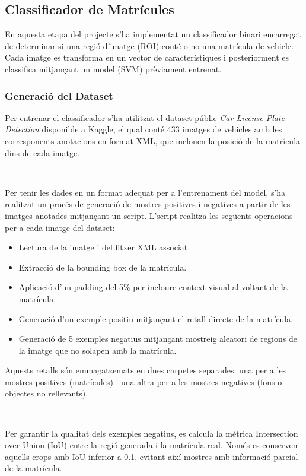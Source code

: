 \subsection{Classificador de Matrícules}

En aquesta etapa del projecte s'ha implementat un classificador binari encarregat de determinar si una regió d'imatge (ROI) conté o no una matrícula de vehicle. Cada imatge es transforma en un vector de característiques i posteriorment es classifica mitjançant un model (SVM) prèviament entrenat. 

\subsubsection{Generació del Dataset}

Per entrenar el classificador s'ha utilitzat el dataset públic \textit{Car License Plate Detection} disponible a Kaggle, el qual conté 433 imatges de vehicles amb les corresponents anotacions en format XML, que inclouen la posició de la matrícula dins de cada imatge.

\

Per tenir les dades en un format adequat per a l'entrenament del model, s'ha realitzat un procés de generació de mostres positives i negatives a partir de les imatges anotades mitjançant un script. L'script realitza les següents operacions per a cada imatge del dataset:

\begin{itemize}
    \item Lectura de la imatge i del fitxer XML associat.
    \item Extracció de la bounding box de la matrícula.
    \item Aplicació d'un padding del 5\% per incloure context visual al voltant de la matrícula.
    \item Generació d'un exemple positiu mitjançant el retall directe de la matrícula.
    \item Generació de 5 exemples negatius mitjançant mostreig aleatori de regions de la imatge que no solapen amb la matrícula.
\end{itemize}

Aquests retalls són emmagatzemats en dues carpetes separades: una per a les mostres positives (matrícules) i una altra per a les mostres negatives (fons o objectes no rellevants).

\

Per garantir la qualitat dels exemples negatius, es calcula la mètrica Intersection over Union (IoU) entre la regió generada i la matrícula real. Només es conserven aquells crops amb IoU inferior a 0.1, evitant així mostres amb informació parcial de la matrícula.


